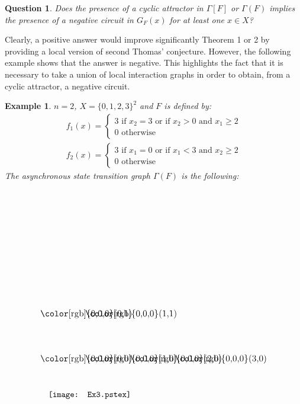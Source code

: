 \documentclass[11pt]{article}
\newtheorem{question}{Question}
\newtheorem{example}{Example}
\begin{document}
\begin{question}
Does the presence of a cyclic attractor in $\Gamma[F]$ or $\Gamma(F)$
implies the presence of a negative circuit in $G_F(x)$ for at least
one $x\in X$?
\end{question}
Clearly, a positive answer would improve significantly Theorem 1 or 2
by providing a local version of second Thomas' conjecture. However,
the following example shows that the answer is negative. This
highlights the fact that it is necessary to take a union of local
interaction graphs in order to obtain, from a cyclic attractor, a
negative circuit.

\begin{example} $n=2$, $X=\{0,1,2,3\}^2$ and $F$ is defined by:
\[
\begin{array}{l}
f_1(x)=
\left\{
\begin{array}{l}
3\textrm{ if $x_2=3$ or if $x_2>0$ and $x_1\geq 2$}\\
0\textrm{ otherwise} 
\end{array}
\right.
\\[13mm]
f_2(x)=
\left\{
\begin{array}{l}
3\textrm{ if $x_1=0$ or if $x_1<3$ and $x_2\geq 2$}\\
0\textrm{ otherwise} 
\end{array}
\right.
\end{array}
\]
The asynchronous state transition graph $\Gamma(F)$ is the following:
\[
\begin{picture}(0,0)\texttt{[image: Ex3.pstex]}\end{picture}\setlength{\unitlength}{3947sp}\begingroup\makeatletter\ifx\SetFigFont\undefined \gdef\SetFigFont#1#2#3#4#5{\reset@font\fontsize{#1}{#2pt}\fontfamily{#3}\fontseries{#4}\fontshape{#5}\selectfont}\fi\endgroup \begin{picture}(4221,4219)(2090,-5170)
\put(2850,-4456){\makebox(0,0)[b]{\smash{{\SetFigFont{11}{13.2}{\rmdefault}{\mddefault}{\updefault}{\color[rgb]{0,0,0}(0,0)}}}}}
\put(2850,-3556){\makebox(0,0)[b]{\smash{{\SetFigFont{11}{13.2}{\rmdefault}{\mddefault}{\updefault}{\color[rgb]{0,0,0}(0,1)}}}}}
\put(3750,-3556){\makebox(0,0)[b]{\smash{{\SetFigFont{11}{13.2}{\rmdefault}{\mddefault}{\updefault}{\color[rgb]{0,0,0}(1,1)}}}}}
\put(3750,-4456){\makebox(0,0)[b]{\smash{{\SetFigFont{11}{13.2}{\rmdefault}{\mddefault}{\updefault}{\color[rgb]{0,0,0}(1,0)}}}}}
\put(4650,-4456){\makebox(0,0)[b]{\smash{{\SetFigFont{11}{13.2}{\rmdefault}{\mddefault}{\updefault}{\color[rgb]{0,0,0}(2,0)}}}}}
\put(5550,-4456){\makebox(0,0)[b]{\smash{{\SetFigFont{11}{13.2}{\rmdefault}{\mddefault}{\updefault}{\color[rgb]{0,0,0}(3,0)}}}}}

\end{picture}\]
\end{example}
\end{document}
